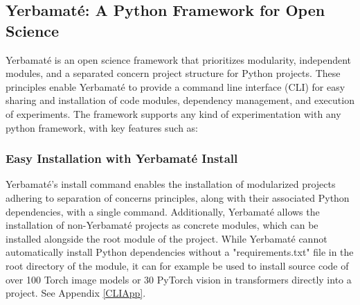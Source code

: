 


\subsection{Yerbamaté: A Python Framework for Open Science}

Yerbamaté is an open science framework that prioritizes modularity, independent modules, and a separated concern project structure for Python projects. These principles enable Yerbamaté to provide a command line interface (CLI) for easy sharing and installation of code modules, dependency management, and execution of experiments. The framework supports any kind of experimentation with any python framework, with key features such as:

\subsubsection{Easy Installation with Yerbamaté Install}

Yerbamaté's install command enables the installation of modularized projects adhering to separation of concerns principles, along with their associated Python dependencies, with a single command. Additionally, Yerbamaté allows the installation of non-Yerbamaté projects as concrete modules, which can be installed alongside the root module of the project. While Yerbamaté cannot automatically install Python dependencies without a "requirements.txt" file in the root directory of the module, it can for example be used to install source code of over 100 Torch image models or 30 PyTorch vision in transformers directly into a project. See Appendix \ref{CLIApp}.

